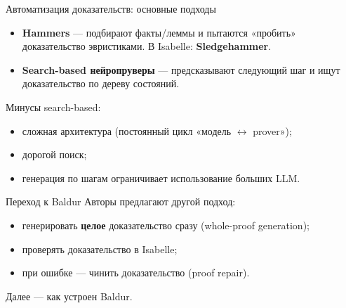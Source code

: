\begin{frame}{Автоматизация доказательств: основные подходы}
\begin{itemize}
  \item \textbf{Hammers} — подбирают факты/леммы и пытаются «пробить» доказательство эвристиками.
        В Isabelle: \textbf{Sledgehammer}.
  \item \textbf{Search-based нейропруверы} — предсказывают следующий шаг и ищут доказательство по дереву состояний.
\end{itemize}

\vspace{2mm}
Минусы search-based:
\begin{itemize}
  \item сложная архитектура (постоянный цикл «модель $\leftrightarrow$ prover»);
  \item дорогой поиск;
  \item генерация по шагам ограничивает использование больших LLM.
\end{itemize}
\end{frame}

\begin{frame}{Переход к Baldur}
Авторы предлагают другой подход:
\begin{itemize}
  \item генерировать \textbf{целое} доказательство сразу (whole-proof generation);
  \item проверять доказательство в Isabelle;
  \item при ошибке — чинить доказательство (proof repair).
\end{itemize}

\vspace{2mm}
Далее — как устроен Baldur.
\end{frame}
